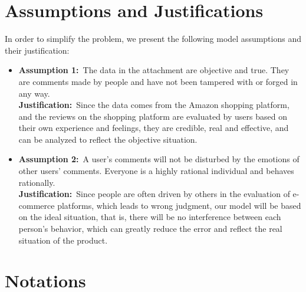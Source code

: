 \documentclass[12pt]{mcmthesis}
\begin{document}
\section{Assumptions and Justifications}
\noindent In order to simplify the problem, we present the following model assumptions and their justification:
\begin{itemize}
	\item\textbf{Assumption 1:}\ The data in the attachment are objective and true. They are comments made by people and have not been tampered with or forged in any way.\\
	\textbf{Justification:}\ Since the data comes from the Amazon shopping platform, and the reviews on the shopping platform are evaluated by users based on their own experience and feelings, they are credible, real and effective, and can be analyzed to reflect the objective situation.
	\item\textbf{Assumption 2:}\ A user's comments will not be disturbed by the emotions of other users' comments. Everyone is a highly rational individual and behaves rationally.\\
	\textbf{Justification:}\ Since people are often driven by others in the evaluation of e-commerce platforms, which leads to wrong judgment, our model will be based on the ideal situation, that is, there will be no interference between each person's behavior, which can greatly reduce the error and reflect the real situation of the product.
\end{itemize}
\section{Notations}
\begin{center}
\end{center}
\newpage
\end{document}
